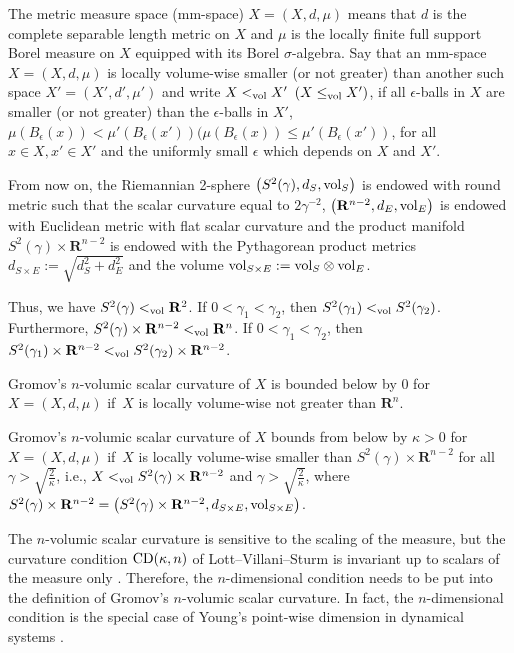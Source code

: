 \documentclass[pdftex]{sigma}
\begin{document}
 The metric measure space (mm-space) $X=(X,d,\mu)$ means that $d$ is the complete separable length metric on $X$ and $\mu$ is the locally finite full support Borel measure on $X$ equipped with its Borel $\sigma$-algebra. Say that an mm-space $X=(X,d,\mu)$ is locally volume-wise smaller (or not greater) than another such space $X'=(X',d',\mu')$ and write $X<_{\rm vol} X'$ $(X\leq_{\rm vol} X')$, if all $\epsilon$-balls in $X$ are smaller (or not greater) than the $\epsilon$-balls in $X'$, $\mu(B_{\epsilon}(x))<\mu'(B_{\epsilon}(x')) (\mu(B_{\epsilon}(x))\leq \mu'(B_{\epsilon}(x'))$, for all $x\in X, x'\in X'$ and the uniformly small $\epsilon$ which depends on $X$ and $ X'$.

From now on, the Riemannian 2-sphere $\big(S^2(\gamma),d_S, {\rm vol}_S\big)$ is endowed with round metric such that the scalar curvature equal to $2\gamma^{-2}$, $\big(\mathbf{R}^{n-2},d_E, {\rm vol}_E\big)$ is endowed with Euclidean metric with flat scalar curvature and the product manifold $S^2(\gamma)\times \mathbf{R}^{n-2}$ is endowed with the Pythagorean product metrics $d_{S\times E}:=\sqrt{d_S^2 + d_E^2}$ and the volume ${\rm vol}_{S\times E}:={\rm vol}_S \otimes {\rm vol}_E$.

Thus, we have $S^2(\gamma)<_{\rm vol} \mathbf{R}^2 $. If $0<\gamma_1< \gamma_2$, then $S^2(\gamma_1)<_{\rm vol} S^2(\gamma_2)$. Furthermore, $S^2(\gamma)\times \mathbf{R}^{n-2}<_{\rm vol} \mathbf{R}^n$. If $0<\gamma_1< \gamma_2$, then $S^2(\gamma_1)\times \mathbf{R}^{n-2}<_{\rm vol} S^2(\gamma_2)\times \mathbf{R}^{n-2}$.

\begin{Definition}
 Gromov's $n$-volumic scalar curvature of $X$ is bounded below by $0$ for $X=(X, d, \mu)$ if~$X$ is locally volume-wise not greater than $\mathbf{R}^n$.

 Gromov's $n$-volumic scalar curvature of $X$ bounds from below by $\kappa>0$ for $X=(X, d, \mu)$ if~$X$ is locally volume-wise smaller than $S^2(\gamma)\times \mathbf{R}^{n-2}$ for all $\gamma>\sqrt{\frac{2}{\kappa}}$, i.e., $X<_{\rm vol} S^2(\gamma)\times \mathbf{R}^{n-2}$ and $\gamma>\sqrt{\frac{2}{\kappa}}$, where $S^2(\gamma)\times \mathbf{R}^{n-2}=\big(S^2(\gamma)\times \mathbf{R}^{n-2},d_{S\times E},{\rm vol}_{S\times E}\big)$.
\end{Definition}

The $n$-volumic scalar curvature is sensitive to the scaling of the measure, but the curvature condition ${\rm CD}(\kappa, n)$ of Lott--Villani--Sturm \cite[Definition~1.3]{MR2237207} is invariant up to scalars of the measure only \cite[Proposition~1.4(ii)]{MR2237207}. Therefore, the $n$-dimensional condition needs to be put into the definition of Gromov's $n$-volumic scalar curvature. In fact, the $n$-dimensional condition is the special case of Young's point-wise dimension in dynamical systems \cite[Theorem~4.4]{MR684248}.
\end{document}
